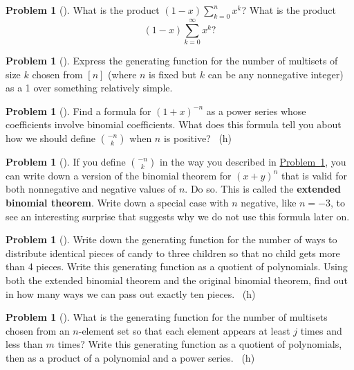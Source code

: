 \documentclass[10pt,]{book}
\newcommand{\terminology}[1]{\textbf{#1}}
\theoremstyle{plain}
\theoremstyle{definition}
\newtheorem{activity}[project]{Problem}
\theoremstyle{definition}
\numberwithin{equation}{chapter}
\begin{document}
\begin{activity}[] \label{activity-193}
\hypertarget{p-1104}{}%
What is the product \((1-x)\sum_{k=0}^n x^k\)? What is the product%
\begin{equation*}
(1-x)\sum_{k=0}^\infty x^k?
\end{equation*}
%
\end{activity}
\begin{activity}[]\marginsymbol[-1em]{} \label{multisetgenfn}
\hypertarget{p-1106}{}%
Express the generating function for the number of multisets of size \(k\) chosen from \([n]\) (where \(n\) is fixed but \(k\) can be any nonnegative integer) as a 1 over something relatively simple.%
\end{activity}
\begin{activity}[] \label{negnchoosek}
\hypertarget{p-1109}{}%
Find a formula for \((1+x)^{-n}\) as a power series whose coefficients involve binomial coefficients. What does this formula tell you about how we should define \(\binom{-n}{k}\) when \(n\) is positive?%
~{\tiny (h)}\end{activity}
\begin{activity}[]\marginsymbol[-1em]{} \label{activity-196}
\hypertarget{p-1113}{}%
If you define \(\binom{-n}{k}\) in the way you described in \hyperref[negnchoosek]{Problem~\ref{negnchoosek}}, you can write down a version of the binomial theorem for \((x+y)^n\) that is valid for both nonnegative and negative values of \(n\). Do so. This is called the \terminology{extended binomial theorem}. Write down a special case with \(n\) negative, like \(n=-3\), to see an interesting surprise that suggests why we do not use this formula later on.%
\end{activity}
\begin{activity}[]\marginsymbol[-1em]{} \label{candygenfn}
\hypertarget{p-1115}{}%
Write down the generating function for the number of ways to distribute identical pieces of candy to three children so that no child gets more than 4 pieces. Write this generating function as a quotient of polynomials. Using both the extended binomial theorem and the original binomial theorem, find out in how many ways we can pass out exactly ten pieces.%
~{\tiny (h)}\end{activity}
\begin{activity}[] \label{activity-198}
\hypertarget{p-1120}{}%
What is the generating function for the number of multisets chosen from an \(n\)-element set so that each element appears at least \(j\) times and less than \(m\) times? Write this generating function as a quotient of polynomials, then as a product of a polynomial and a power series.%
~{\tiny (h)}\end{activity}
\end{document}
